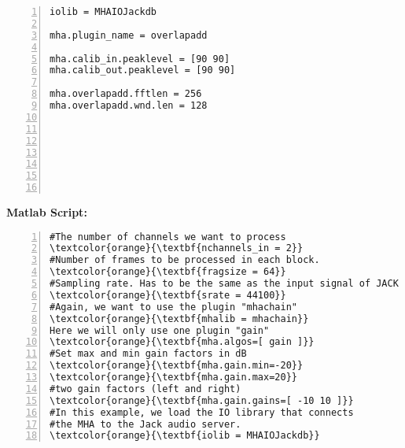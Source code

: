 \documentclass[11pt,a4paper,twoside]{article}
\newcommand{\+}{\discretionary{\mbox{\scriptsize$\hookleftarrow$}}{}{}}
\begin{document}
\begin{enumerate}
\begin{Verbatim}[frame=single,numbers=left,commandchars=\\\{\}]
iolib = MHAIOJackdb

mha.plugin_name = overlapadd

mha.calib_in.peaklevel = [90 90]
mha.calib_out.peaklevel = [90 90]

mha.overlapadd.fftlen = 256
mha.overlapadd.wnd.len = 128








\end{Verbatim} 

\textbf{Matlab Script:}

\begin{Verbatim}[frame=single,numbers=left,commandchars=\\\{\}]
#The number of channels we want to process
\textcolor{orange}{\textbf{nchannels_in = 2}}
#Number of frames to be processed in each block.
\textcolor{orange}{\textbf{fragsize = 64}}
#Sampling rate. Has to be the same as the input signal of JACK
\textcolor{orange}{\textbf{srate = 44100}}
#Again, we want to use the plugin "mhachain"
\textcolor{orange}{\textbf{mhalib = mhachain}}
Here we will only use one plugin "gain"
\textcolor{orange}{\textbf{mha.algos=[ gain ]}}
#Set max and min gain factors in dB
\textcolor{orange}{\textbf{mha.gain.min=-20}}
\textcolor{orange}{\textbf{mha.gain.max=20}}
#two gain factors (left and right)
\textcolor{orange}{\textbf{mha.gain.gains=[ -10 10 ]}}
#In this example, we load the IO library that connects
#the MHA to the Jack audio server.
\textcolor{orange}{\textbf{iolib = MHAIOJackdb}}
\end{Verbatim} 















\end{enumerate}
\newpage
\end{document}
